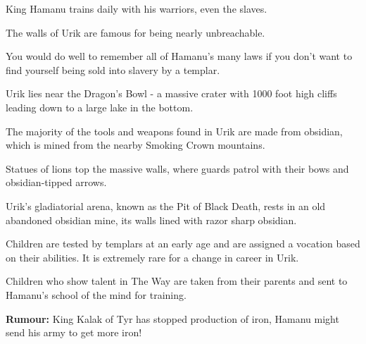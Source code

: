 \begin{multicols}{2}
\begin{description}
    \item King Hamanu trains daily with his warriors, even the slaves.
    \item The walls of Urik are famous for being nearly unbreachable.
    \item You would do well to remember all of Hamanu’s many laws if you don’t want to find yourself being sold into slavery by a templar.
    \item Urik lies near the Dragon’s Bowl - a massive crater with 1000 foot high cliffs leading down to a large lake in the bottom.
    \item The majority of the tools and weapons found in Urik are made from obsidian, which is mined from the nearby Smoking Crown mountains.
    \item Statues of lions top the massive walls, where guards patrol with their bows and obsidian-tipped arrows.
    \item Urik’s gladiatorial arena, known as the Pit of Black Death, rests in an old abandoned obsidian mine, its walls lined with razor sharp obsidian.
    \item Children are tested by templars at an early age and are assigned a vocation based on their abilities. It is extremely rare for a change in career in Urik.
    \item Children who show talent in The Way are taken from their parents and sent to Hamanu’s school of the mind for training.
    \item \textbf{Rumour:} King Kalak of Tyr has stopped production of iron, Hamanu might send his army to get more iron!
\end{description}

\end{multicols}
